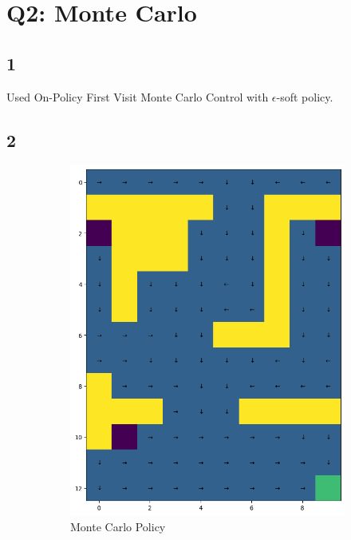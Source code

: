 \section*{Q2: Monte Carlo}
\subsection*{1}
Used On-Policy First Visit Monte Carlo Control with $\epsilon$-soft
policy. 


\subsection*{2}
\begin{figure}[H]
    \centering
    \begin{subfigure}[b]{0.49\textwidth}
        \centering
        \includegraphics[width=\textwidth]{assets/mc/mc_policy.png}        
        \caption{Monte Carlo Policy}
    \end{subfigure}
    \hfill 
    \begin{subfigure}[b]{0.49\textwidth}

\end{subfigure}
\end{figure}
